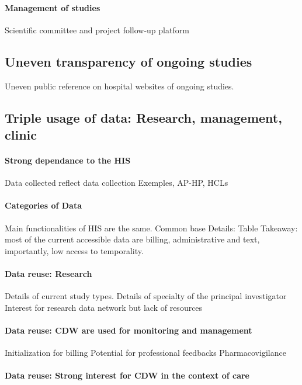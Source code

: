 \documentclass[french,12pt,twoside,a4paper]{book}
\begin{document}
\paragraph{Management of studies}

Scientific committee and project follow-up platform

\subsection{Uneven transparency of ongoing
  studies}\label{subsec:cdw:results:transparency} Uneven public reference on
hospital websites of ongoing studies.

\subsection{Triple usage of data: Research, management,
  clinic}\label{subsec:cdw:results:data}

\paragraph{Strong dependance to the HIS}

Data collected reflect data collection
Exemples, AP-HP, HCLs

\paragraph{Categories of Data}

Main functionalities of HIS are the same. Common base Details: Table Takeaway:
most of the current accessible data are billing, administrative and text,
importantly, low access to temporality.

\paragraph{Data reuse: Research}
Details of current study types.
Details of specialty of the principal investigator
Interest for research data network but lack of resources

\paragraph{Data reuse: CDW are used for monitoring and management}
Initialization for billing
Potential for professional feedbacks
Pharmacovigilance

\paragraph{Data reuse: Strong interest for CDW in the context of care}
\end{document}

